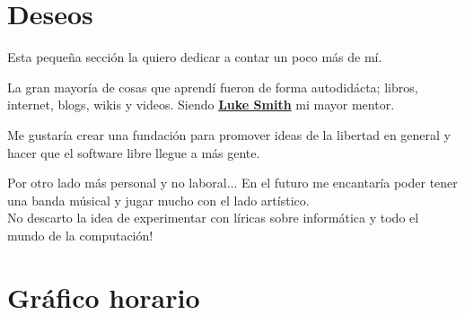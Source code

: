 \documentclass[%
               doublesided,
               paper=a4,
               fontsize=10pt
              ]{resume}
\begin{document}
{    \section{Deseos}
    Esta pequeña sección la quiero dedicar a contar un poco más de mí.

    \medskip
    La gran mayoría de cosas que aprendí fueron de forma autodidácta; libros, internet, blogs, wikis y videos. 
    Siendo \textbf{\href{https://lukesmith.xyz/}{Luke Smith}} mi mayor mentor.

    \medskip
    Me gustaría crear una fundación para promover ideas de la libertad en general y hacer que el software libre llegue a más gente.

    \medskip
    Por otro lado más personal y no laboral... En el futuro me encantaría poder tener una banda músical y jugar mucho con el lado artístico.\\
    No descarto la idea de experimentar con líricas sobre informática y todo el mundo de la computación!

    \section{Gráfico horario}
}
\makebody
\end{document}
